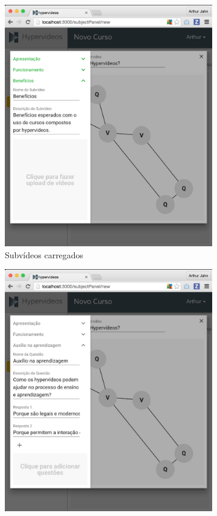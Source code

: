 \begin{figure}[h!]
  	\centering
  	\begin{subfigure}{.5\textwidth}
  		\centering
  		\includegraphics[width=.95\linewidth]{figuras/autoria_construcao_a.eps}
  		\caption{Subvídeos carregados}
  		\label{fig:autoria_construcao_a}
	\end{subfigure}%
	\begin{subfigure}{.5\textwidth}
  		\centering
  		\includegraphics[width=.95\linewidth]{figuras/autoria_construcao_b.eps}

\end{subfigure}
\end{figure}
